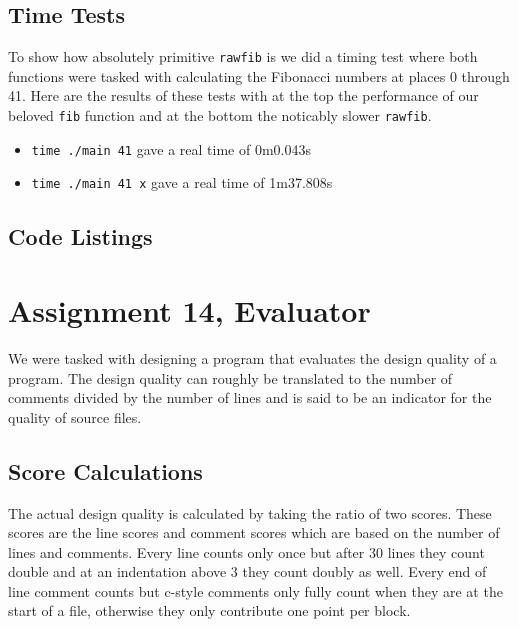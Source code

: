\documentclass[a4paper]{article}
\begin{document}
\subsection*{Time Tests}
To show how absolutely primitive \texttt{rawfib} is we did a timing test where both functions were tasked with calculating the Fibonacci numbers at places 0 through 41. Here are the results of these tests with at the top the performance of our beloved \texttt{fib} function and at the bottom the noticably slower \texttt{rawfib}.

\begin{itemize}
\item \texttt{time ./main 41} gave a real time of 0m0.043s
\item \texttt{time ./main 41 x} gave a real time of 1m37.808s
\end{itemize}


\subsection*{Code Listings}





%
%
%
%
%

\section*{Assignment 14, Evaluator}
We were tasked with designing a program that evaluates the design quality of a program.
The design quality can roughly be translated to the number of comments divided by the number of lines and is said to be an indicator for the quality of source files.

\subsection*{Score Calculations}
The actual design quality is calculated by taking the ratio of two scores.
These scores are the line scores and comment scores which are based on the number of lines and comments.
Every line counts only once but after 30 lines they count double and at an indentation above 3 they count doubly as well.
Every end of line comment counts but c-style comments only fully count when they are at the start of a file, otherwise they only contribute one point per block.
\end{document}
